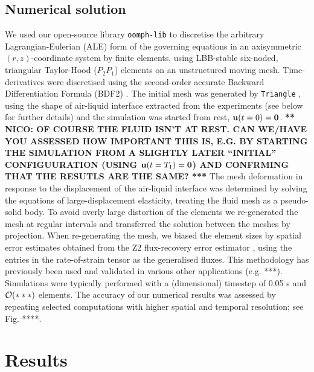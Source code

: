 \documentclass[aip,graphicx]{revtex4-1}
\begin{document}
\subsection{Numerical solution}
We used our open-source library \texttt{oomph-lib} \cite{HeilHazelOomph2006}
to discretise the arbitrary Lagrangian-Eulerian (ALE) form
\cite{donea1982arbitrary} of
the governing equations in an axisymmetric $(r,z)$-coordinate system 
by finite elements, using LBB-stable
\cite{sani2000incompressible}
six-noded, triangular Taylor-Hood ($P_2 P_1$)
elements\cite{taylor1973numerical} on an unstructured moving mesh. 
Time-derivatives were discretised using the second-order accurate Backward
Differentiation Formula (BDF2) \cite{sani2000incompressible}.
The initial mesh was generated by \texttt{Triangle} \cite{shewchuk96b},
using the shape of air-liquid interface extracted from the
experiments (see below for further details) and the simulation was
started from rest, ${\bf u}(t=0)={\bf 0}$. {\bf *** NICO: OF COURSE
  THE FLUID ISN'T AT REST. CAN WE/HAVE YOU ASSESSED HOW IMPORTANT THIS
IS, E.G. BY STARTING THE SIMULATION FROM A SLIGHTLY LATER ``INITIAL''
CONFIGUURATION (USING ${\bf u}(t=T_1)={\bf 0}$) AND CONFRMING 
THAT THE RESUTLS ARE THE SAME? ***}
The mesh deformation in response
to the displacement of the air-liquid interface was determined by 
solving the equations of large-displacement elasticity, 
treating the fluid mesh as a pseudo-solid body. To avoid overly large 
distortion of the elements we re-generated the mesh at regular 
intervals and transferred the solution between the meshes by
projection. When re-generating the mesh, we biased the element sizes
by spatial error estimates obtained from the Z2 flux-recovery error
estimator \cite{***}, using the entries in the rate-of-strain tensor as the
generalised fluxes. This methodology has previously been 
used and validated in various other applications (e.g. ***).
Simulations were typically performed with a (dimensional) timestep of 
0.05 s and ${\cal O}(***)$ elements. The accuracy of our numerical 
results was assessed by repeating selected computations with higher 
spatial and temporal resolution; see Fig. ****.


\section{Results}
\end{document}
